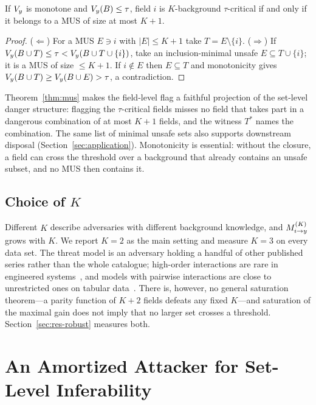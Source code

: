\begin{theorem}\label{thm:mus}
If $V_{y}$ is monotone and $V_{y}(B)\le\tau$, field $i$ is $K$-background $\tau$-critical if and
only if it belongs to a MUS of size at most $K+1$.
\end{theorem}
\begin{proof}
($\Leftarrow$) For a MUS $E\ni i$ with $|E|\le K+1$ take $T=E\setminus\{i\}$.
($\Rightarrow$) If $V_{y}(B\cup T)\le\tau<V_{y}(B\cup T\cup\{i\})$, take an inclusion-minimal unsafe
$E\subseteq T\cup\{i\}$; it is a MUS of size $\le K+1$. If $i\notin E$ then $E\subseteq T$ and
monotonicity gives $V_{y}(B\cup T)\ge V_{y}(B\cup E)>\tau$, a contradiction.
\end{proof}
Theorem~\ref{thm:mus} makes the field-level flag a faithful projection of the set-level
danger structure: flagging the $\tau$-critical fields misses no field that takes part in a
dangerous combination of at most $K+1$ fields, and the witness $T^*$ names the combination.
The same list of minimal unsafe sets also supports downstream disposal
(Section~\ref{sec:application}).
Monotonicity is essential: without the closure, a field can cross the threshold over a
background that already contains an unsafe subset, and no MUS then contains it.


\subsection{Choice of $K$}
Different $K$ describe adversaries with different background knowledge, and $M^{(K)}_{i \to y}$ grows with $K$.
We report $K=2$ as the main setting and measure $K=3$ on every data set. The threat model is an
adversary holding a handful of other published series rather than the whole catalogue;
high-order interactions are rare in engineered systems~\cite{li2006regularities}, and models with
pairwise interactions are close to unrestricted ones on tabular data~\cite{lou2013ga2m}. There is,
however, no general saturation theorem---a parity function of $K+2$ fields defeats any fixed
$K$---and saturation of the maximal gain does not imply that no larger set crosses a threshold.
Section~\ref{sec:res-robust} measures both.

\section{An Amortized Attacker for Set-Level Inferability}\label{sec:model}

